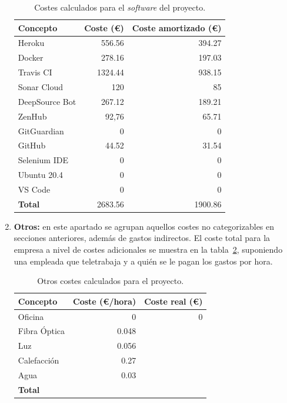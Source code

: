 \begin{enumerate}
\begin{table}[p]
	\centering
	\begin{tabular}{l r r}
		\toprule
		\textbf{Concepto} & \textbf{Coste (€)} & \textbf{Coste amortizado (€)} \\
		\midrule
		Heroku & 556.56 & 394.27 \\
		Docker & 278.16 & 197.03 \\
		Travis CI & 1324.44 & 938.15\\
		Sonar Cloud  & 120 & 85\\
		DeepSource Bot  & 267.12 & 189.21\\
		ZenHub  & 92,76 & 65.71\\
		GitGuardian  & 0 & 0\\
		GitHub  & 44.52 & 31.54\\
		Selenium IDE & 0 & 0\\
		Ubuntu 20.4  & 0 & 0\\
		VS Code  & 0 & 0\\
		\midrule
		\textbf{Total} & 2683.56 & 1900.86 \\
		\bottomrule
	\end{tabular}
	\caption[Costes: \textit{software}]{Costes calculados para el \textit{software} del proyecto.}
	\label{a:costes-software}
\end{table}


\item\textbf{Otros:} en este apartado se agrupan aquellos costes no categorizables en secciones anteriores, además de gastos indirectos. El coste total para la empresa a nivel de costes adicionales se muestra en la tabla~\ref{a:costes-otros}, suponiendo una empleada que teletrabaja y a quién se le pagan los gastos por hora.

\begin{table}[p]
	\centering
	\begin{tabular}{l r r}
		\toprule
		\textbf{Concepto} & \textbf{Coste (€/hora)} & \textbf{Coste real (€)} \\
		\midrule
		Oficina & 0 & 0\\
		Fibra Óptica & 0.048 & \\
		Luz & 0.056 & \\
		Calefacción & 0.27 & \\
		Agua & 0.03 & \\
		\midrule
		\textbf{Total} & & \\
		\bottomrule
	\end{tabular}
	\caption[Costes: otros]{Otros costes calculados para el proyecto.}
	\label{a:costes-otros}
\end{table}



\end{enumerate}
